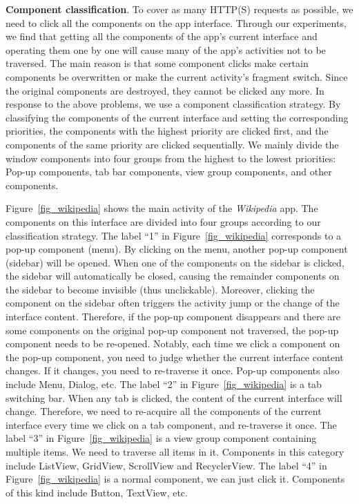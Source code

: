 \documentclass[sigconf,review, anonymous]{acmart}
\begin{document}
 
\textbf{Component classification}. To cover as many HTTP(S) requests as possible, we need to click all the components on the app interface. Through our experiments, we find that getting all the components of the app's current interface and operating them one by one will cause many of the app's activities not to be traversed. The main reason is that some component clicks make certain components be overwritten or make the current activity's fragment switch. Since the original components are destroyed, they cannot be clicked any more. In response to the above problems, we use a component classification strategy. By classifying the components of the current interface and setting the corresponding priorities, the components with the highest priority are clicked first, and the components of the same priority are clicked sequentially. We mainly divide the window components into four groups from the highest to the lowest priorities: Pop-up components, tab bar components, view group components, and other components. 

Figure~\ref{fig_wikipedia} shows the main activity of the \textit{Wikipedia} app. The components on this interface are divided into four groups according to our classification strategy. The label ``1'' in Figure~\ref{fig_wikipedia} corresponds to a pop-up component (menu). By clicking on the menu, another pop-up component (sidebar) will be opened. When one of the components on the sidebar is clicked, the sidebar will automatically be closed, causing the remainder components on the sidebar to become invisible (thus unclickable). Moreover, clicking the component on the sidebar often triggers the activity jump or the change of the interface content. Therefore, if the pop-up component disappears and there are some components on the original pop-up component not traversed, the pop-up component needs to be re-opened. Notably, each time we click a component on the pop-up component, you need to judge whether the current interface content changes. If it changes, you need to re-traverse it once. Pop-up components also include Menu, Dialog, etc. The label ``2'' in Figure~\ref{fig_wikipedia} is a tab switching bar. When any tab is clicked, the content of the current interface will change. Therefore, we need to re-acquire all the components of the current interface every time we click on a tab component, and re-traverse it once. The label ``3'' in Figure~\ref{fig_wikipedia} is a view group component containing multiple items. We need to traverse all items in it. Components in this category include ListView, GridView, ScrollView and RecyclerView. The label ``4'' in Figure~\ref{fig_wikipedia} is a normal component, we can just click it. Components of this kind include Button, TextView, etc.
\end{document}

